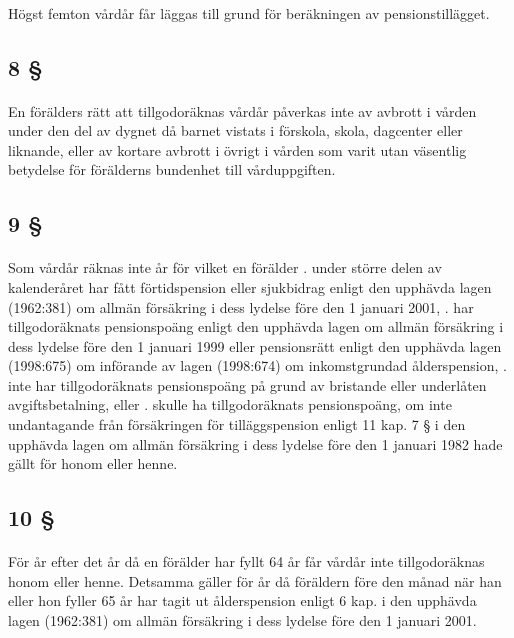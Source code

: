 \documentclass[a4paper,notitlepage,openany,10pt]{book}
\begin{document}
\paragraph*{}
Högst femton vårdår får läggas till grund för beräkningen av pensionstillägget.
\subsection*{8 §}
\paragraph*{}
En förälders rätt att tillgodoräknas vårdår påverkas inte av avbrott i vården under den del av dygnet då barnet vistats i förskola, skola, dagcenter eller liknande, eller av kortare avbrott i övrigt i vården som varit utan väsentlig betydelse för förälderns bundenhet till vårduppgiften.
\subsection*{9 §}
\paragraph*{}
Som vårdår räknas inte år för vilket en förälder
. under större delen av kalenderåret har fått förtidspension eller sjukbidrag enligt den upphävda lagen (1962:381) om allmän försäkring i dess lydelse före den 1 januari 2001,
. har tillgodoräknats pensionspoäng enligt den upphävda lagen om allmän försäkring i dess lydelse före den 1 januari 1999 eller pensionsrätt enligt den upphävda lagen (1998:675) om införande av lagen (1998:674) om inkomstgrundad ålderspension,
. inte har tillgodoräknats pensionspoäng på grund av bristande eller underlåten avgiftsbetalning, eller
. skulle ha tillgodoräknats pensionspoäng, om inte undantagande från försäkringen för tilläggspension enligt 11 kap. 7 § i den upphävda lagen om allmän försäkring i dess lydelse före den 1 januari 1982 hade gällt för honom eller henne.
\subsection*{10 §}
\paragraph*{}
För år efter det år då en förälder har fyllt 64 år får vårdår inte tillgodoräknas honom eller henne. Detsamma gäller för år då föräldern före den månad när han eller hon fyller 65 år har tagit ut ålderspension enligt 6 kap. i den upphävda lagen (1962:381) om allmän försäkring i dess lydelse före den 1 januari 2001.
\end{document}
